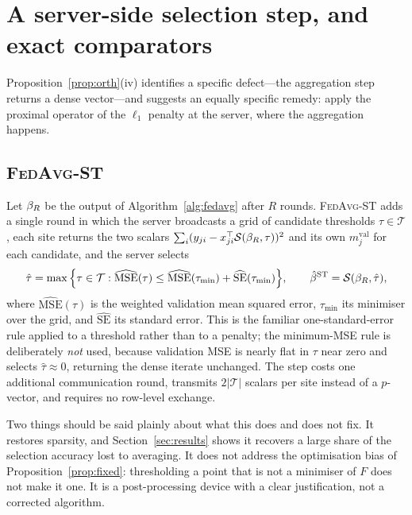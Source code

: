 \section{A server-side selection step, and exact comparators}
\label{sec:method}

Proposition~\ref{prop:orth}(iv) identifies a specific defect---the
aggregation step returns a dense vector---and suggests an equally specific
remedy: apply the proximal operator of the $\ell_1$ penalty at the server,
where the aggregation happens.

\subsection{\textsc{FedAvg-ST}}

Let $\beta_R$ be the output of Algorithm~\ref{alg:fedavg} after $R$ rounds.
\textsc{FedAvg-ST} adds a single round in which the server broadcasts a grid
of candidate thresholds $\tau \in \mathcal{T}$, each site returns the two
scalars $\sum_i (y_{ji} - x_{ji}^\top \mathcal{S}(\beta_R,\tau))^2$ and its own
$m_j^{\mathrm{val}}$ for each candidate, and the server selects
\begin{equation}
\hat\tau = \max\Big\{\tau \in \mathcal{T} :
  \widehat{\mathrm{MSE}}(\tau) \le
  \widehat{\mathrm{MSE}}(\tau_{\min}) + \widehat{\mathrm{SE}}(\tau_{\min})\Big\},
\qquad
\hat{\beta}^{\mathrm{ST}} = \mathcal{S}(\beta_R, \hat\tau),
\label{eq:st}
\end{equation}
where $\widehat{\mathrm{MSE}}(\tau)$ is the weighted validation mean squared
error, $\tau_{\min}$ its minimiser over the grid, and
$\widehat{\mathrm{SE}}$ its standard error. This is the familiar
one-standard-error rule applied to a threshold rather than to a penalty; the
minimum-MSE rule is deliberately \emph{not} used, because validation MSE is
nearly flat in $\tau$ near zero and selects $\hat\tau \approx 0$, returning
the dense iterate unchanged. The step costs one additional communication
round, transmits $2|\mathcal{T}|$ scalars per site instead of a
$p$-vector, and requires no row-level exchange.

Two things should be said plainly about what this does and does not fix.
It restores sparsity, and Section~\ref{sec:results} shows it recovers a
large share of the selection accuracy lost to averaging. It does not
address the optimisation bias of Proposition~\ref{prop:fixed}: thresholding
a point that is not a minimiser of $F$ does not make it one. It is a
post-processing device with a clear justification, not a corrected
algorithm.

